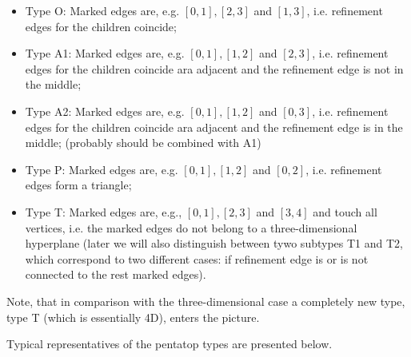 \documentclass[a4paper,12pt]{amsart}
\numberwithin{equation}{section}
\begin{document}
\begin{itemize}
	\item Type O: Marked edges are, e.g. $[0,1], [2,3]$ and $[1,3]$, i.e. refinement edges for the children coincide;
	\item Type A1: Marked edges are, e.g. $[0,1], [1,2]$ and $[2,3]$, i.e. refinement edges for the children coincide ara adjacent and the refinement edge is not in the middle;
	\item Type A2: Marked edges are, e.g. $[0,1], [1,2]$ and $[0,3]$, i.e. refinement edges for the children coincide ara adjacent and the refinement edge is in the middle; (probably should be combined with A1)
	\item Type P: Marked edges are, e.g. $[0,1], [1,2]$ and $[0,2]$, i.e. refinement edges form a triangle;
	\item Type T: Marked edges are, e.g., $[0,1], [2,3]$ and $[3,4]$ and  touch all vertices, i.e. the marked edges do not belong to a three-dimensional hyperplane (later we will also distinguish between tywo subtypes T1 and T2, which correspond to two different cases: if refinement edge is or is not connected to the rest marked edges).
\end{itemize}

Note, that in comparison with the three-dimensional case a completely new type, type T (which is essentially 4D), enters the picture.

Typical representatives of the pentatop types are presented below.
\end{document}
